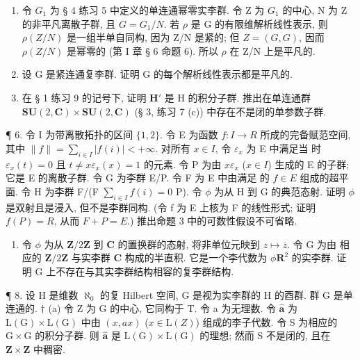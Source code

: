 \begin{enumerate}
\def\labelenumi{\arabic{enumi}.}
\setcounter{enumi}{2}
\item
  令 \(G_{1}\) 为 § 4 练习 5 中定义的单连通幂零实李群. 令 Z 为 \(G_{1}\) 的中心, N 为 Z 的非平凡离散子群, 且 \(G = G_{1}/N\). 若 \(\rho\) 是 G 的有限维解析线性表示, 则 \(\rho(Z/N)\) 是一组半单自同构, 因为 Z/N 是紧的; 但 \(Z = (G, G)\), 因而 \(\rho(Z/N)\) 是幂零的 (第 I 章 § 6 命题 6). 所以 \(\rho\) 在 Z/N 上是平凡的.
\item
  设 G 是紧连通复李群. 证明 G 的每个解析线性表示都是平凡的.
\item
  在 § 1 练习 9 的记号下, 证明 \(\mathbf{H}'\) 是 H 的积分子群. 推出在单连通群 \(\mathbf{SU}(2,\mathbf{C})\times \mathbf{SU}(2,\mathbf{C})\) (§ 3, 练习 7 (c)) 中存在不是闭的单参数子群.
\end{enumerate}

¶ 6. 令 I 为带离散拓扑的区间 \(\{1,2\}\). 令 E 为函数 \(f: I \to R\) 所成的完备赋范空间, 其中 \(\|f\| = \sum_{i \in I} |f(i)| < +\infty\). 对所有 \(x \in I\), 令 \(\varepsilon_x\) 为 E 中满足当  时 \(\varepsilon_x(t) = 0\) 且 \(t \neq x\)\(\varepsilon_x(x) = 1\) 的元素. 令 P 为由 \(x\varepsilon_x\) (\(x \in I\)) 生成的 E 的子群; 它是 E 的离散子群. 令 G 为李群 E/P. 令 F 为 E 中由满足  的 \(f \in E\) 组成的超平面. 令 H 为李群 F/(F \(\sum_{i \in I} f(i) = 0\) P). 令 \(\phi\) 为从 H 到 G 的典范态射. 证明 \(\phi\) 是双射且是浸入, 但不是李群同构. (令 f 为 E 上核为 F 的线性形式; 证明 \(f(P) = R\), 从而 \(F + P = E\).) 推出命题 3 中的可数性假设不可省略.

\begin{enumerate}
\def\labelenumi{\arabic{enumi}.}
\setcounter{enumi}{6}
\tightlist
\item
  令 \(\phi\) 为从 \(\mathbf{Z} / 2\mathbf{Z}\) 到 \(\mathbf{C}\) 的置换群的态射, 将非单位元映到 \(z\mapsto \overline{z}\). 令 \(\mathrm{G}\) 为由  相应的 \(\mathbf{Z} / 2\mathbf{Z}\) 与实李群 \(\mathbf{C}\) 构成的半直积. 它是一个李代数为 \(\phi\)\(\mathbf{R}^2\) 的实李群. 证明 \(\mathrm{G}\) 上不存在与其实李群结构相容的复李群结构.
\end{enumerate}

¶ 8. 设 H 是维数 \(\aleph_{0}\) 的复 Hilbert 空间, G 是视为实李群的 H 的酉群. 群 G 是单连通的. \(\dagger\) (a) 令 Z 为 G 的中心, 它同构于 T. 令 a 为无理数. 令 \(\hat{\mathbf{a}}\) 为 \(\mathrm{L}(\mathrm{G})\times \mathrm{L}(\mathrm{G})\) 中由 \((x,ax)\) (\(x\in \mathrm{L}(Z)\)) 组成的李子代数. 令 S 为相应的 \(\mathrm{G}\times \mathrm{G}\) 的积分子群. 则 \(\hat{\mathbf{a}}\) 是 \(\mathrm{L}(\mathrm{G})\times \mathrm{L}(\mathrm{G})\) 的理想; 然而 S 不是闭的, 且在 \(\mathbf{Z}\times \mathbf{Z}\) 中稠密.

